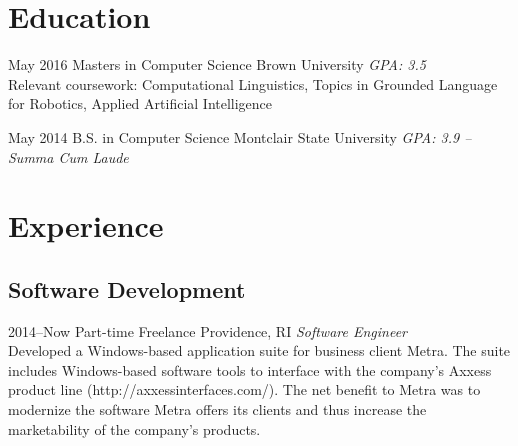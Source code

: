 \documentclass[]{friggeri-cv} %
\begin{document}
\section{Education}

\begin{entrylist}


\entry
{May 2016}
{Masters {\normalfont in Computer Science}}
{Brown University}
{\emph{GPA: 3.5} \\ Relevant coursework: Computational Linguistics, Topics in Grounded Language for Robotics, Applied Artificial Intelligence}


\entry
{May 2014}
{B.S. {\normalfont in Computer Science}}
{Montclair State University}
{\emph{GPA: 3.9 -- Summa Cum Laude}}


\end{entrylist}


\section{Experience}

\subsection{Software Development}

\begin{entrylist}


\entry
{2014--Now}
{Part-time Freelance}
{Providence, RI}
{\emph{Software Engineer} \\
Developed a Windows-based application suite for business client Metra.  The suite includes Windows-based software tools to interface with the company's Axxess product line (http://axxessinterfaces.com/).  The net benefit to Metra was to modernize the software Metra offers its clients and thus increase the marketability of the company's products. }


\end{entrylist}
\end{document}
